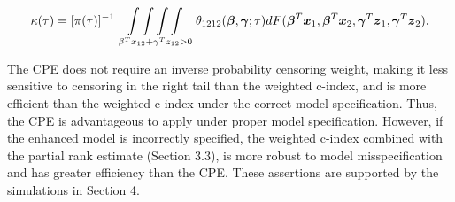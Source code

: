 \documentclass[12pt]{article}
\newcommand{\bmx}{\mbox{\boldmath $x$}}
\newcommand{\bg}{\mbox{\boldmath $\gamma$}}
\newcommand{\bb}{\mbox{\boldmath $\beta$}}
\newcommand{\bmz}{\mbox{\boldmath $z$}}
\def\stackunder#1#2{\mathrel{\mathop{#2}\limits_{#1}}}
\begin{document}
\begin{equation} \kappa(\tau) = [\pi(\tau)]^{-1} \stackunder{\beta^T x_{12} + \gamma^T z_{12} >  0}{\int \int \int \int} \theta_{1212}(\bb, \bg; \tau) dF(\bb^T\bmx_1, \bb^T\bmx_2,  \bg^T\bmz_1, \bg^T\bmz_2) . \end{equation}

The CPE does not require an inverse probability censoring weight, making it less sensitive to censoring in the right tail than the weighted c-index, and is more efficient than the weighted c-index under the correct model specification. Thus, the CPE is advantageous to apply under proper model specification. However, if the enhanced model is incorrectly specified, the weighted c-index combined with the partial rank estimate (Section 3.3), is more robust to model misspecification and has greater efficiency than the CPE.  These assertions are supported by the simulations in Section 4.






\end{document}
